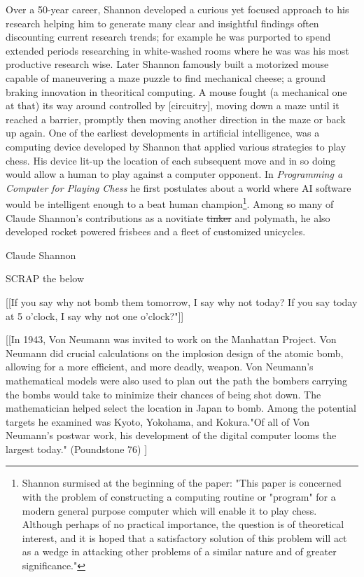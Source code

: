 \documentclass[7pt]{article}
\begin{document}
Over a 50-year career, Shannon developed a curious yet focused approach to his research helping him to generate many clear and insightful findings often discounting current research trends; for example he was purported to spend extended periods researching in white-washed rooms where he was was his most productive research wise. Later Shannon famously built a motorized mouse capable of maneuvering a maze puzzle to find  mechanical cheese; a ground braking innovation in theoritical computing. A mouse fought (a mechanical one at that) its way  around  controlled by [circuitry], moving down a maze until it reached a barrier, promptly then moving another direction in the maze or back up again. One of the earliest developments in artificial intelligence, was a computing device developed by Shannon that applied various strategies to play chess. His device lit-up the location of each subsequent move and in so doing would allow a human to play against a computer opponent. In \emph{Programming a Computer for Playing Chess} he first postulates about a world where AI software would be intelligent  enough to a beat human champion\footnote{Shannon surmised at the beginning of the paper: "This paper is concerned with the problem of constructing a computing routine or "program" for a modern general purpose computer which will enable it to play chess. Although perhaps of no practical importance, the question is of theoretical interest, and it is hoped that a satisfactory solution of this problem will act as a wedge in attacking other problems of a similar nature and of greater significance."}. Among so many of Claude Shannon's contributions as a novitiate \st{tinker} and polymath, he also developed rocket powered frisbees and a fleet of customized unicycles.



\vfill
\begin{center}    
	{Claude Shannon}
\end{center}
\vfill

\newpage



SCRAP the below




[[If you say why not bomb them tomorrow, I say why not today? If you say today at 5 o'clock, I say why not one o'clock?"]]

[[In 1943, Von Neumann was invited to work on the Manhattan Project. Von Neumann did crucial calculations on the implosion design of the atomic bomb, allowing for a more efficient, and more deadly, weapon. Von Neumann's mathematical models were also used to plan out the path the bombers carrying the bombs would take to minimize their chances of being shot down. The mathematician helped select the location in Japan to bomb. Among the potential targets he examined was Kyoto, Yokohama, and Kokura."Of all of Von Neumann's postwar work, his development of the digital computer looms the largest today." (Poundstone 76) ]
\end{document}

